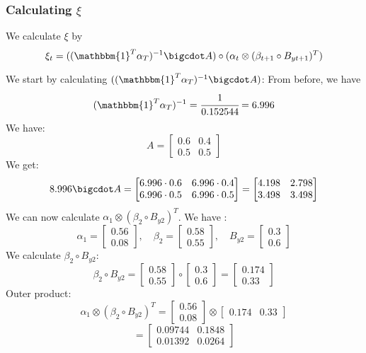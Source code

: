 \subsubsection{Calculating $\xi$}
We calculate $\xi$ by
\[
\xi_t = ((\mathbbm{1}^T\alpha_T)^{-1} \bigcdot A) \circ (\alpha_t \otimes (\beta_{t+1} \circ B_{yt+1})^T)
\]

We start by calculating $((\mathbbm{1}^T\alpha_T)^{-1} \bigcdot A)$:
From before, we have 
\[
(\mathbbm{1}^T\alpha_T)^{-1} = \cfrac{1}{0.152544} = 6.996
\]
We have:
\[
  A = \begin{bmatrix}
  0.6 & 0.4 \\
  0.5 & 0.5
  \end{bmatrix}
\]
We get:
\[
8.996 \bigcdot A = \begin{bmatrix}
    6.996 \cdot 0.6 & 6.996 \cdot 0.4 \\ 6.996 \cdot 0.5 & 6.996 \cdot 0.5
\end{bmatrix} = \begin{bmatrix}
    4.198 & 2.798 \\ 3.498 & 3.498
\end{bmatrix}
\]
We can now calculate $\alpha_1 \otimes (\beta_2 \circ B_{y2})^T$.
We have 
:
\[
\alpha_1 = \begin{bmatrix}
    0.56 \\ 0.08
\end{bmatrix}, \quad \beta_2 = \begin{bmatrix}
    0.58 \\ 0.55
\end{bmatrix}, \quad B_{y2} = \begin{bmatrix}
    0.3 \\ 0.6
\end{bmatrix}
\]
We calculate $\beta_2 \circ B_{y2}$:
\[
\beta_2 \circ B_{y2} = \begin{bmatrix}
    0.58 \\ 0.55
\end{bmatrix} \circ \begin{bmatrix}
    0.3 \\ 0.6
\end{bmatrix} = \begin{bmatrix}
    0.174 \\ 0.33
\end{bmatrix}
\]
Outer product:
\[
\alpha_1 \otimes (\beta_2 \circ B_{y2})^T = \begin{bmatrix}
    0.56 \\ 0.08
\end{bmatrix} \otimes \begin{bmatrix}
    0.174 & 0.33
\end{bmatrix} \] \[ = \begin{bmatrix}
    0.09744 & 0.1848 \\ 0.01392 & 0.0264
\end{bmatrix}
\]

